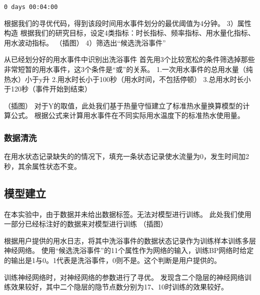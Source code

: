 \documentclass[11pt]{article}
\begin{document}
    \begin{Verbatim}[commandchars=\\\{\}]
0 days 00:04:00

    \end{Verbatim}

    根据我们的寻优代码，得到该段时间用水事件划分的最优阈值为4分钟。
3）属性构造
根据我们的研究目标，设定4类指标：时长指标、频率指标、用水量化指标、用水波动指标。
（插图） 4）筛选出``候选洗浴事件''

从已经划分好的用水事件中识别出洗浴事件
首先用3个比较宽松的条件筛选掉那些非常短暂的用水事件，这3个条件是``或''的关系。
1.一次用水事件的总用水量（纯热水）小于y升
2.用水时长小于100秒（用水时间，不包括停顿）
3.总用水时长小于120秒（事件开始到结束）

（插图）
对于Y的取值，此处我们基于热量守恒建立了标准热水量换算模型的计算公式。
根据公式来计算用水事件在不同实际用水温度下的标准热水使用量。

\subsubsection{数据清洗}\label{ux6570ux636eux6e05ux6d17}

在用水状态记录缺失的的情况下，填充一条状态记录使水流量为0，发生时间加2秒，其余属性状态不变。

\subsection{模型建立}\label{ux6a21ux578bux5efaux7acb}

在本实验中，由于数据并未给出数据标签。无法对模型进行训练。
此处我们使用一部分已经标注好的数据来对模型进行训练 （插图）

根据用户提供的用水日志，将其中洗浴事件的数据状态记录作为训练样本训练多层神经网络。
使用``候选洗浴事件''的11个属性作为网络的输入，训练BP网络时给定的输出是1与0。1代表是洗浴事件，0则不是。这个判断是用户提供的。

训练神经网络时，对神经网络的参数进行了寻优。
发现含二个隐层的神经网络训练效果较好，其中二个隐层的隐节点数分别为17、10时训练的效果较好。
\end{document}
